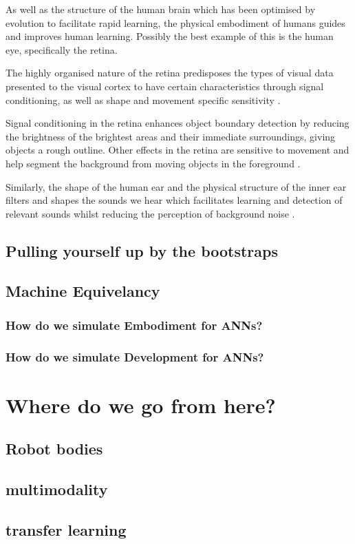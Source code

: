 As well as the structure of the human brain which has been optimised by evolution to facilitate rapid learning, the physical embodiment of humans guides and improves human learning. Possibly the best example of this is the human eye, specifically the retina.

The highly organised nature of the retina predisposes the types of visual data presented to the visual cortex to have certain characteristics through signal conditioning, as well as shape and movement specific sensitivity \cite{masland2012neuronal}.

Signal conditioning in the retina enhances object boundary detection by reducing the brightness of the brightest areas and their immediate surroundings, giving objects a rough outline. Other effects in the retina are sensitive to movement and help segment the background from moving objects in the foreground \cite{olveczky2003segregation}.

Similarly, the shape of the human ear and the physical structure of the inner ear filters and shapes the sounds we hear which facilitates learning and detection of relevant sounds whilst reducing the perception of background noise \cite{oxenham2018we}.
\subsection{Pulling yourself up by the bootstraps}

\subsection{Machine Equivelancy}
\subsubsection{How do we simulate Embodiment for ANNs?}
\cite{lee2008sparse}
\subsubsection{How do we simulate Development for ANNs?}

\section{Where do we go from here?}
\subsection{Robot bodies}
\subsection{multimodality}
\subsection{transfer learning}


